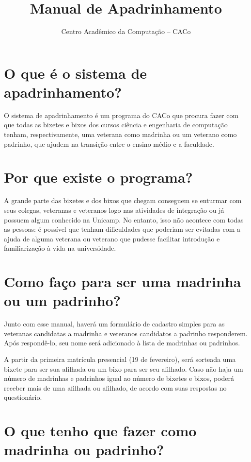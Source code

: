 \documentclass[10pt]{article}
\title{Manual de Apadrinhamento}
\author{Centro Acadêmico da Computação -- CACo}
\date{\the\year}
\begin{document}
\maketitle

\section*{O que é o sistema de apadrinhamento?}

O sistema de apadrinhamento é um programa do CACo que procura fazer com que
todas as bixetes e bixos dos cursos ciência e engenharia de computação tenham,
respectivamente, uma veterana como madrinha ou um veterano como padrinho, que
ajudem na transição entre o ensino médio e a faculdade.

\section*{Por que existe o programa?}

A grande parte das bixetes e dos bixos que chegam conseguem se enturmar com
seus colegas, veteranas e veteranos logo nas atividades de integração ou já
possuem algum conhecido na Unicamp. No entanto, isso não acontece com todas as
pessoas: é possível que tenham dificuldades que poderiam ser evitadas com a
ajuda de alguma veterana ou veterano que pudesse facilitar introdução e
familiarização à vida na universidade.

\section*{Como faço para ser uma madrinha ou um padrinho?}

Junto com esse manual, haverá um formulário de cadastro simples para as
veteranas candidatas a madrinha e veteranos candidatos a padrinho responderem.
Após respondê-lo, seu nome será adicionado à lista de madrinhas ou padrinhos.

A partir da primeira matrícula presencial (19 de fevereiro), será sorteada uma
bixete para ser sua afilhada ou um bixo para ser seu afilhado. Caso não haja um
número de madrinhas e padrinhos igual ao número de bixetes e bixos, poderá
receber mais de uma afilhada ou afilhado, de acordo com suas respostas no
questionário.

\section*{O que tenho que fazer como madrinha ou padrinho?}
\end{document}

